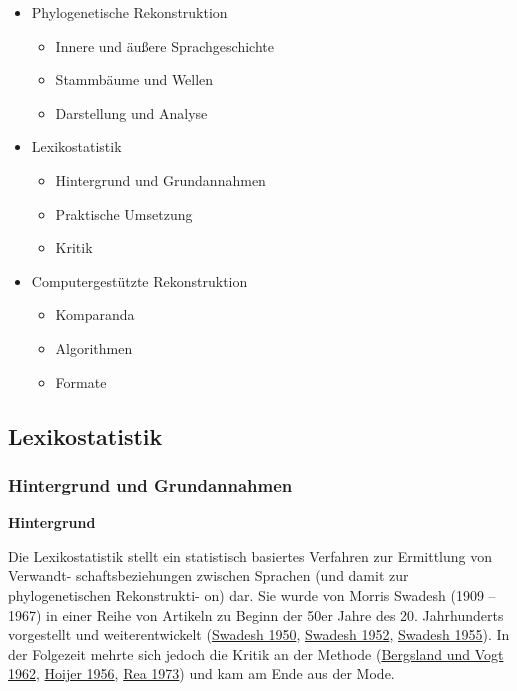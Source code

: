 \begin{itemize}
\itemsep1pt\parskip0pt
\item
  {Phylogenetische Rekonstruktion}

  \begin{itemize}
  \itemsep1pt\parskip0pt
  \item
    {Innere und äußere Sprachgeschichte}
  \item
    {Stammbäume und Wellen}
  \item
    {Darstellung und Analyse}
  \end{itemize}
\item
  {Lexikostatistik}

  \begin{itemize}
  \itemsep1pt\parskip0pt
  \item
    {Hintergrund und Grundannahmen}
  \item
    {Praktische Umsetzung}
  \item
    {Kritik}
  \end{itemize}
\item
  {Computergestützte Rekonstruktion}

  \begin{itemize}
  \itemsep1pt\parskip0pt
  \item
    {Komparanda}
  \item
    {Algorithmen}
  \item
    {Formate}
  \end{itemize}
\end{itemize}

\subsection{\texorpdfstring{{Lexikostatistik}}{Lexikostatistik}}

\subsubsection{\texorpdfstring{{Hintergrund und
Grundannahmen}}{Hintergrund und Grundannahmen}}

\textbf{Hintergrund}

Die Lexikostatistik stellt ein statistisch basiertes Verfahren zur
Ermittlung von Verwandt- schaftsbeziehungen zwischen Sprachen (und damit
zur phylogenetischen Rekonstrukti- on) dar. Sie wurde von Morris Swadesh
(1909 -- 1967) in einer Reihe von Artikeln zu Beginn der 50er Jahre des
20. Jahrhunderts vorgestellt und weiterentwickelt
(\href{http://bibliography.lingpy.org?key=Swadesh1950}{Swadesh 1950},
\href{http://bibliography.lingpy.org?key=Swadesh1952}{Swadesh 1952},
\href{http://bibliography.lingpy.org?key=Swadesh1955}{Swadesh 1955}). In
der Folgezeit mehrte sich jedoch die Kritik an der Methode
(\href{http://bibliography.lingpy.org?key=Bergsland1962}{Bergsland und
Vogt 1962}, \href{http://bibliography.lingpy.org?key=Hoijer1956}{Hoijer
1956}, \href{http://bibliography.lingpy.org?key=Rea1973}{Rea 1973}) und
kam am Ende aus der Mode.

